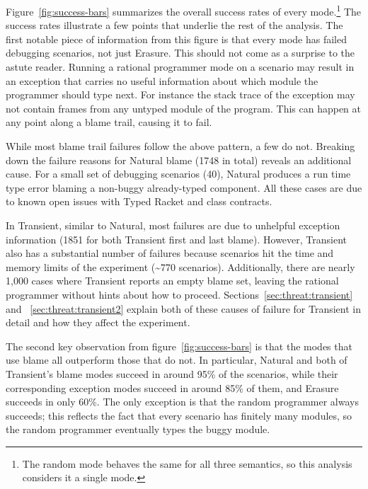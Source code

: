 Figure~\ref{fig:success-bars} summarizes the overall success rates of
every mode.\footnote{The random mode behaves the same for
all three semantics, so this analysis considers it a single mode.}
The success rates illustrate a few points that underlie the
rest of the analysis.  The first notable piece of information from this
figure is that every mode has failed debugging scenarios, not just
Erasure. This should not come as a surprise to the astute reader.  Running
a rational programmer mode on a scenario may result in an exception
that carries no useful information about which module the programmer
should type next. For instance the stack trace of the exception may not
contain frames from any untyped module of the program. This can happen at any point
along a blame trail, causing it to fail.

While most blame trail failures follow the above pattern, a few do
not.  Breaking down the failure reasons for Natural blame (1748 in
total) reveals an additional cause. For a small set of debugging scenarios
(40), Natural produces a run time type error blaming a non-buggy
already-typed component. All these cases are due to known open issues with Typed
Racket and class contracts. 

In Transient, similar to Natural, most failures are due to unhelpful
exception information (1851 for both Transient first and last blame).
However, Transient also has a substantial number of failures because
scenarios hit the time and memory limits of the experiment
(\textasciitilde770 scenarios).  Additionally, there are nearly 1,000
cases where Transient reports an empty blame set, leaving the rational
programmer without hints about how to proceed.
Sections~\ref{sec:threat:transient} and ~\ref{sec:threat:transient2}
explain both of these causes of failure for Transient in detail and how
they affect the
experiment. 

The second key observation from figure~\ref{fig:success-bars} is that the
modes that use blame all outperform those that do not.  In particular,
Natural and both of Transient's blame modes succeed in around 95\% of the
scenarios, while their corresponding exception modes succeed in around
85\% of them, and Erasure succeeds in only 60\%.  The only
exception is that the random programmer always succeeds; this reflects the
fact that every scenario has finitely many modules, so the random programmer 
eventually types the buggy module.


